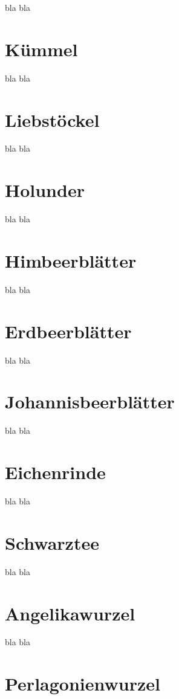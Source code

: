 bla bla

\section{Kümmel}

bla bla

\section{Liebstöckel}

bla bla

\section{Holunder}

bla bla

\section{Himbeerblätter}

bla bla

\section{Erdbeerblätter}

bla bla

\section{Johannisbeerblätter}

bla bla

\section{Eichenrinde}

bla bla

\section{Schwarztee}

bla bla

\section{Angelikawurzel}

bla bla

\section{Perlagonienwurzel}

